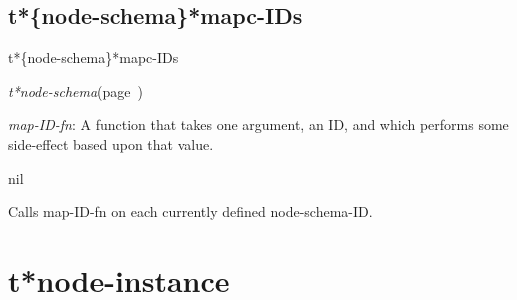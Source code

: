\subsection{t*\{node-schema\}*mapc-IDs}
\label{t*node-schema*mapc-IDs}

\begin{description}
\item [Name:]  t*\{node-schema\}*mapc-IDs

\item [Class:] {\sl t*node-schema}\hfill(page~\pageref{t*node-schema})

\item [Parameters:]
\item {\sl map-ID-fn}:  A function that takes one argument, an ID,
and which performs some side-effect based upon that
value.



\item [Return-value:] nil

\item [Description:]

Calls map-ID-fn on each currently defined node-schema-ID.

\item [Public:]



\end{description}
\horizontalline

\section{t*node-instance}
\label{t*node-instance}

